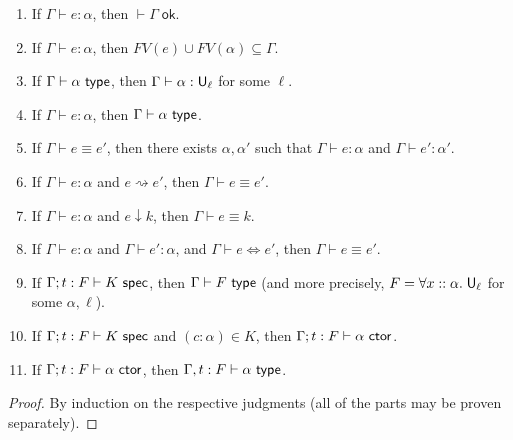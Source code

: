 \begin{lemma}[Regularity]\label{thm:reg}
\begin{enumerate}
\item If $\Gamma\vdash e:\alpha$, then $\vdash\Gamma\;\mathsf{ok}$.
\item If $\Gamma\vdash e:\alpha$, then $FV(e)\cup FV(\alpha)\subseteq\Gamma$.
\item If $\Gamma\vdash\alpha\type$, then $\Gamma\vdash\alpha:\U_\ell$ for some $\ell$.
\item If $\Gamma\vdash e:\alpha$, then $\Gamma\vdash\alpha\type$.
\item\label{item:defeq_reg2} If $\Gamma\vdash e\equiv e'$, then there exists $\alpha,\alpha'$ such that $\Gamma\vdash e:\alpha$ and $\Gamma\vdash e':\alpha'$.
\item If $\Gamma\vdash e:\alpha$ and $e\rightsquigarrow e'$, then $\Gamma\vdash e\equiv e'$.
\item If $\Gamma\vdash e:\alpha$ and $e\downarrow k$, then $\Gamma\vdash e\equiv k$.
\item\label{item:alg_defn} If $\Gamma\vdash e:\alpha$ and $\Gamma\vdash e':\alpha$, and $\Gamma\vdash e\Leftrightarrow e'$, then $\Gamma\vdash e\equiv e'$.
\item If $\Gamma;t:F\vdash K\spec$, then $\Gamma\vdash F\type$ (and more precisely, $F=\forall x::\alpha.\;\mathsf{U}_\ell$ for some $\alpha,\ell$).
\item If $\Gamma;t:F\vdash K\spec$ and $(c:\alpha)\in K$, then $\Gamma;t:F\vdash\alpha\ctor$.
\item If $\Gamma;t:F\vdash \alpha\ctor$, then $\Gamma,t:F\vdash\alpha\type$.
\end{enumerate}
\end{lemma}
\begin{proof}
By induction on the respective judgments (all of the parts may be proven separately).
\end{proof}

